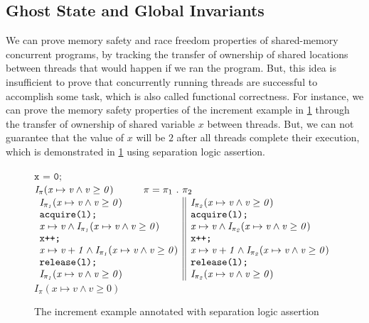 \documentclass[acmsmall,screen]{acmart}\settopmatter{printfolios=true}
\begin{document}
\subsection{Ghost State and Global Invariants}
We can prove memory safety and race freedom properties of shared-memory concurrent programs, by tracking the transfer of ownership of shared locations between threads that would happen if we ran the program. But, this idea is insufficient to prove that concurrently running threads are successful to accomplish some task, which is also called functional correctness. For instance, we can prove the memory safety properties of the increment example in  \ref{figure1} through the transfer of ownership of shared variable $x$ between threads. But, we can not guarantee that the value of $x$ will be $2$ after all threads complete their execution, which is demonstrated in \ref{figure1} using separation logic assertion.   
\begin{figure}[htb]
\centering
$\texttt{x = 0;}$\\
$\mathit{I_{\pi}(x \mapsto v \land v \geq 0)}\hspace{30px}\pi = \pi_1\ .\ \pi_2$\\
$\begin{array}{l || l}
\mathit{I_{\pi_1}(x \mapsto v \land v \geq 0)} & \mathit{I_{\pi_2}(x \mapsto v \land v \geq 0)}\\
\texttt{acquire(l);} & \texttt{acquire(l);}\\
\mathit{x \mapsto v \land I_{\pi_1}(x \mapsto v \land v \geq 0)} & \mathit{x \mapsto v \land I_{\pi_2}(x \mapsto v \land v \geq 0)}\\
\texttt{x++;} & \texttt{x++;}\\
\mathit{x \mapsto v+1 \land I_{\pi_1}(x \mapsto v \land v \geq 0)} & \mathit{x \mapsto v+1 \land I_{\pi_2}(x \mapsto v \land v \geq 0)}\\
\texttt{release(l);} & \texttt{release(l);}\\
\mathit{I_{\pi_1}(x \mapsto v \land v \geq 0)} & \mathit{I_{\pi_2}(x \mapsto v \land v \geq 0)}\\
\end{array}$\\
$\mathit{I_{\pi}(x \mapsto v \land v \geq 0)}$
\caption{The increment example annotated with separation logic assertion}
\label{figure1}
\end{figure}
\end{document}
